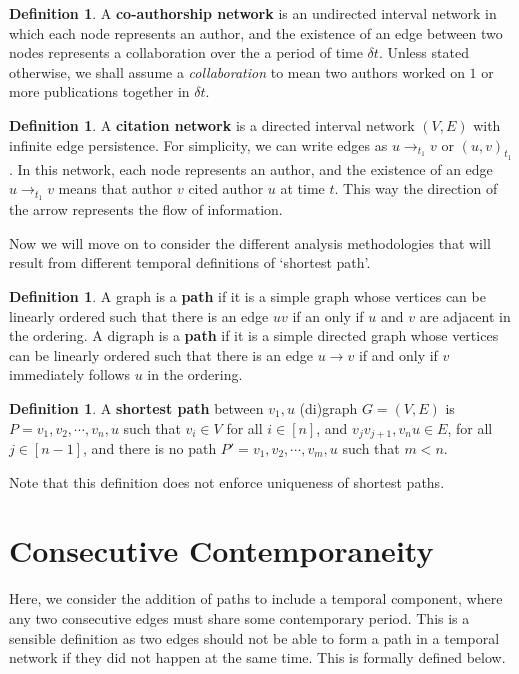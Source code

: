 \documentclass{article}
\theoremstyle{definition}
\newtheorem{defn}[thm]{Definition}
\numberwithin{thm}{subsection}
\begin{document}
\begin{defn}
  A \textbf{co-authorship network} is an undirected interval network in which
  each node represents an author, and the existence of an edge between two nodes
  represents a collaboration over the a period of time $\delta t$. Unless stated
  otherwise, we shall assume a \textit{collaboration} to mean two authors worked
  on $1$ or more publications together in $\delta t$.
\end{defn}

\begin{defn}
  A \textbf{citation network} is a directed interval network $(V,E)$ with
  infinite edge persistence. For simplicity, we can write edges as $u \to_{t_1}
  v$ or $(u,v)_{t_1}$.  In this network, each node represents an author, and the
  existence of an edge $u \to_{t_1} v$ means that author $v$ cited author $u$
  at time $t$. This way the direction of the arrow represents the flow of
  information.
\end{defn}


Now we will move on to consider the different analysis methodologies that will
result from different temporal definitions of `shortest path'.

\begin{defn}
  A graph is a \textbf{path} if it is a simple graph whose vertices can be linearly
  ordered such that there is an edge $uv$ if an only if $u$ and $v$ are adjacent
  in the ordering.
  A digraph is a \textbf{path} if it is a simple directed graph whose vertices
  can be linearly ordered such that there is an edge $u \to v$ if and only if
  $v$ immediately follows $u$ in the ordering.
\end{defn}

\begin{defn}
 A \textbf{shortest path} between $v_1, u$ (di)graph $G = (V,E)$ is
 $P = v_1, v_2, \cdots, v_n, u$ such that $v_i \in V$ for all $i \in [n]$,
 and $v_jv_{j+1}, v_nu \in E$, for all $j \in [n-1]$, and there is no path
 $P' = v_1, v_2, \cdots, v_m, u$ such that $m < n$.
 \end{defn}

Note that this definition does not enforce uniqueness of shortest paths.

\section{Consecutive Contemporaneity}

Here, we consider the addition of paths to include a temporal component, where
any two consecutive edges must share some contemporary period. This is a sensible
definition as two edges should not be able to form a path in a temporal network
if they did not happen at the same time. This is formally defined below.
\end{document}
